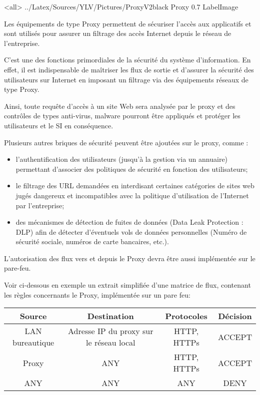 \mode<all>{\picframe
{../Latex/Sources/YLV/Pictures/ProxyV2black}%
{Proxy} %
{0.7} %
{LabelImage} %
}

Les équipements de type Proxy permettent de sécuriser l'accès aux applicatifs et sont utilisés pour assurer un filtrage des accès Internet depuis le réseau de l'entreprise.

C'est une des fonctions primordiales de la sécurité du système d'information.
En effet, il est indispensable de maîtriser les flux de sortie et d'assurer la sécurité des utilisateurs sur Internet en imposant un filtrage via des équipements réseaux de type Proxy.

Ainsi, toute requête d'accès à un site Web sera analysée par le proxy et des contrôles de types anti-virus, malware pourront être appliqués et protéger les utilisateurs et le SI en conséquence.

Plusieurs autres briques de sécurité peuvent être ajoutées sur le proxy, comme :
\begin{itemize}
    \item l'authentification des utilisateurs (jusqu'à la gestion via un annuaire) permettant d'associer des politiques de sécurité en fonction des utilisateurs;
    \item le filtrage des URL demandées en interdisant certaines catégories de sites web jugés dangereux et incompatibles avec la politique d'utilisation de l'Internet par l'entreprise;
    \item des mécanismes de détection de fuites de données (Data Leak Protection : DLP) afin de détecter d'éventuels vols de données personnelles (Numéro de sécurité sociale, numéros de carte bancaires, etc.).
\end{itemize}

L'autorisation des flux vers et depuis le Proxy devra être aussi implémentée sur le pare-feu.

Voir ci-dessous en exemple un extrait simplifiée d'une matrice de flux, contenant les règles concernants le Proxy, implémentée sur un pare feu:

\begin{center}
\begin{tabular}{||c c c c||} 
 \hline
 Source & Destination & Protocoles & Décision \\ [0.5ex] 
 \hline\hline
 LAN bureautique & Adresse IP du proxy sur le réseau local & HTTP, HTTPs & ACCEPT \\ 
 \hline
 Proxy & ANY & HTTP, HTTPs & ACCEPT \\
 \hline
 ANY & ANY & ANY & DENY \\
 \hline
\end{tabular}
\end{center}

